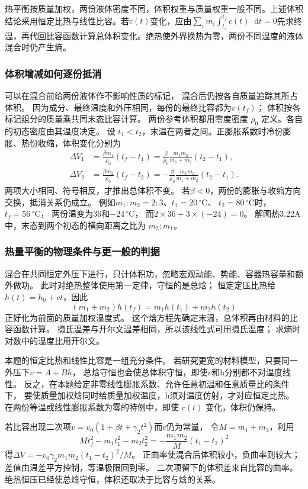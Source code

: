 \documentclass[UTF8,fontset=fandol,a4paper,11pt]{ctexart}
\newcommand{\dd}{\mathop{}\!\mathrm{d}}
\begin{document}
热平衡按质量加权，两份液体密度不同，体积权重与质量权重一般不同。上述体积结论采用恒定比热与线性比容。若$c(t)$变化，应由$\sum_i m_i\int_{t_i}^{t_f}c(t)\dd t=0$先求终温，再代回比容函数计算总体积变化。绝热使外界换热为零，两份不同温度的液体混合时仍产生熵。
\subsubsection*{体积增减如何逐份抵消}
可以在混合前给两份液体作不影响性质的标记，
混合后仍按各自质量追踪其所占体积。
因为成分、最终温度和外压相同，每份的最终比容都为$v(t_f)$；
体积按各标记组分的质量乘共同末态比容计算。
两份参考体积都用零度密度 $\rho_0$ 定义。各自的初态密度由其温度决定。
设 $t_1<t_2$，末温在两者之间。正膨胀系数时冷份膨胀、热份收缩，体积变化分别为
\[
\begin{aligned}
\Delta V_1&=\frac{\beta m_1}{\rho_0}(t_f-t_1)
=\frac{\beta}{\rho_0}\frac{m_1m_2}{m_1+m_2}(t_2-t_1),\\
\Delta V_2&=\frac{\beta m_2}{\rho_0}(t_f-t_2)
=-\frac{\beta}{\rho_0}\frac{m_1m_2}{m_1+m_2}(t_2-t_1).
\end{aligned}
\]
两项大小相同、符号相反，才推出总体积不变。
若$\beta<0$，两份的膨胀与收缩方向交换，抵消关系仍成立。
例如$m_1:m_2=2:3$、$t_1=20\,^{\circ}\mathrm C$、
$t_2=80\,^{\circ}\mathrm C$时，$t_f=56\,^{\circ}\mathrm C$，
两份温变为36和$-24\,^{\circ}\mathrm C$，
而$2\times36+3\times(-24)=0$。
解图热3.22A中，末态到两个初态的横向距离之比为 $m_2:m_1$。

\subsubsection*{热量平衡的物理条件与更一般的判据}
混合在共同恒定外压下进行，只计体积功，忽略宏观动能、势能、容器热容量和额外做功。
此时对绝热整体使用第一定律，守恒的是总焓；
恒定定压比热给$h(t)=h_0+ct$，因此
\[
(m_1+m_2)h(t_f)=m_1h(t_1)+m_2h(t_2)
\]
正好化为前面的质量加权温度式。
这个焓方程先确定末温，总体积再由材料的比容函数计算。
摄氏温差与开尔文温差相同，所以该线性式可用摄氏温度；
求熵时对数中的温度比用开尔文。

本题的恒定比热和线性比容是一组充分条件。
若研究更宽的材料模型，只要同一外压下$v=A+Bh$，
总焓守恒也会使总体积守恒，即使$v$和h分别都不对温度线性。
反之，在本题给定非零线性膨胀系数、允许任意初温和任意质量比的条件下，
要使质量加权焓同时给质量加权温度，h须对温度仿射，才对应恒定比热。
在两份等温或线性膨胀系数为零的特例中，即使 $c(t)$ 变化，体积仍保持。

若比容出现二次项$v=v_0(1+\beta t+\gamma_2t^2)$而c仍为常量，
令$M=m_1+m_2$，利用
\[
Mt_f^2-m_1t_1^2-m_2t_2^2
=-\frac{m_1m_2}{M}(t_1-t_2)^2
\]
得$\Delta V=-v_0\gamma_2m_1m_2(t_1-t_2)^2/M$。
正曲率使混合后体积较小，负曲率则较大；
差值由温差平方控制，等温极限回到零。
二次项留下的体积差来自比容的曲率。绝热恒压已经使总焓守恒，体积还取决于比容与焓的关系。
\end{document}

